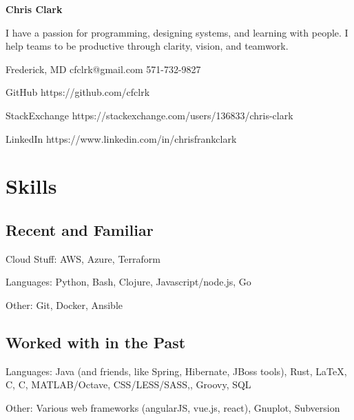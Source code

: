 \documentclass[12pt]{article}
\def\CC{{C\nolinebreak[4]\hspace{-.05em}\raisebox{.4ex}{\tiny\bf ++}}}
\begin{document}
\begin{center}
  {\sffamily\huge\textbf{Chris Clark}}
\end{center}

I have a passion for programming, designing systems, and learning with people. I
help teams to be productive through clarity, vision, and teamwork.

Frederick, MD
cfclrk@gmail.com
571-732-9827

GitHub https://github.com/cfclrk

StackExchange https://stackexchange.com/users/136833/chris-clark

LinkedIn https://www.linkedin.com/in/chrisfrankclark

\vspace{-9pt}


  \section*{Skills}

  \begin{multicols}{2}
    \raggedright

    \subsection*{Recent and Familiar}

    Cloud Stuff: AWS, Azure, Terraform

    Languages: Python, Bash, Clojure, Javascript/node.js, Go

    Other: Git, Docker, Ansible

    \subsection*{Worked with in the Past}

    Languages: Java (and friends, like Spring, Hibernate, JBoss tools), Rust,
    \LaTeX, C, \CC, MATLAB/Octave, CSS/LESS/SASS,, Groovy, SQL

    Other: Various web frameworks (angularJS, vue.js, react), Gnuplot,
    Subversion

    \vfill
    \columnbreak

  \end{multicols}
\end{document}

